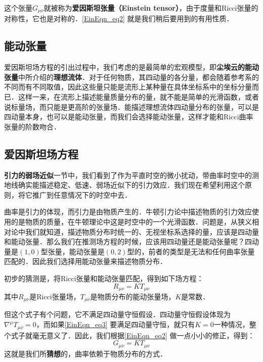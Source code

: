 这个张量$G_{\mu\nu}$就被称为\textbf{爱因斯坦张量（Einstein tensor）}，由于度量和Ricci张量的对称性，它也是对称的．\autoref{EinEqn_eq2} 就是我们稍后要用到的有用性质．



\subsection{能动张量}

爱因斯坦场方程的引出过程中，我们考虑的是最简单的宏观模型，即\textbf{尘埃云的能动张量}中所介绍的\textbf{理想流体}．对于任何物质，其四动量的各分量，都会随着参考系的不同而有不同取值，因此这些量只能是流形上某种量在具体坐标系中的坐标分量而已．这样一来，在流形上描述能量质量分布的量，就不能是简单的光滑函数，或者说标量场，而只能是更高阶的张量场．能描述理想流体四动量分布的张量，可以是四动量本身，也可以是能动张量，而我们会选择能动张量，这样才能和Ricci曲率张量的阶数吻合．





\subsection{爱因斯坦场方程}

\textbf{引力的弱场近似}一节中，我们看到了作为平直时空的微小扰动，带曲率时空中的测地线确实能描述稳定、低速、弱场近似下的引力效应．我们现在希望利用这个原则，将它推广到任意情况下的时空中去．

曲率是引力的体现，而引力是由物质产生的．牛顿引力论中描述物质的引力效应使用的是物质的质量，在牛顿理论中这是时空中的一个光滑函数．问题是，从狭义相对论中我们就知道，描述物质分布时统一的、无视坐标系选择的量，应该是四动量和能动张量．那么我们在推测场方程的时候，应该用四动量还是能动张量呢？四动量是$(1, 0)$型张量，能动张量是$(0, 2)$型的，前者的类型是无法和任何曲率张量匹配的．因此我们选择用能动张量来描述物质分布．

初步的猜测是，将Ricci张量和能动张量匹配，得到如下场方程：
\begin{equation}\label{EinEqn_eq3}
R_{\mu\nu}=KT_{\mu\nu}
\end{equation}
其中$R_{\mu\nu}$是Ricci张量场，$T_{\mu\nu}$是物质分布的能动张量场，$K$是常数．

但这个式子有个问题，它不满足四动量守恒假设．四动量守恒假设体现为$\nabla^\mu T_{\mu\nu}=0$，而如果\autoref{EinEqn_eq3} 要满足四动量守恒，就只有$K=0$一种情况，整个式子就毫无意义了．因此，我们根据\autoref{EinEqn_eq2} 做一点小小的修正，得到：
\begin{equation}
G_{\mu\nu}=KT_{\mu\nu}
\end{equation}
这就是我们所\textbf{猜想}的，曲率依赖于物质分布的方式．


